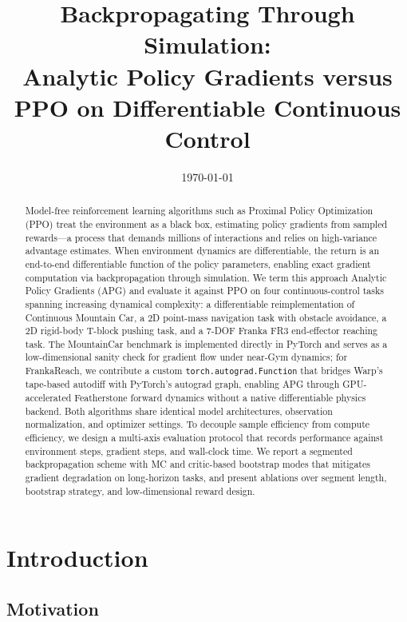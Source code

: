 \documentclass[11pt,a4paper]{article}
\title{\textbf{Backpropagating Through Simulation: \\ Analytic Policy Gradients versus PPO on Differentiable Continuous Control}}
\author{
}
\date{\today}
\begin{document}
\maketitle

\begin{abstract}
Model-free reinforcement learning algorithms such as Proximal Policy Optimization (PPO) treat the environment as a black box, estimating policy gradients from sampled rewards—a process that demands millions of interactions and relies on high-variance advantage estimates. When environment dynamics are differentiable, the return is an end-to-end differentiable function of the policy parameters, enabling exact gradient computation via backpropagation through simulation. We term this approach Analytic Policy Gradients (APG) and evaluate it against PPO on four continuous-control tasks spanning increasing dynamical complexity: a differentiable reimplementation of Continuous Mountain Car, a 2D point-mass navigation task with obstacle avoidance, a 2D rigid-body T-block pushing task, and a 7-DOF Franka FR3 end-effector reaching task. The MountainCar benchmark is implemented directly in PyTorch and serves as a low-dimensional sanity check for gradient flow under near-Gym dynamics; for FrankaReach, we contribute a custom \texttt{torch.autograd.Function} that bridges Warp's tape-based autodiff with PyTorch's autograd graph, enabling APG through GPU-accelerated Featherstone forward dynamics without a native differentiable physics backend. Both algorithms share identical model architectures, observation normalization, and optimizer settings. To decouple sample efficiency from compute efficiency, we design a multi-axis evaluation protocol that records performance against environment steps, gradient steps, and wall-clock time. We report a segmented backpropagation scheme with MC and critic-based bootstrap modes that mitigates gradient degradation on long-horizon tasks, and present ablations over segment length, bootstrap strategy, and low-dimensional reward design.
\end{abstract}

\section{Introduction}
\label{sec:introduction}

\subsection{Motivation}
\label{sec:motivation}
\end{document}
